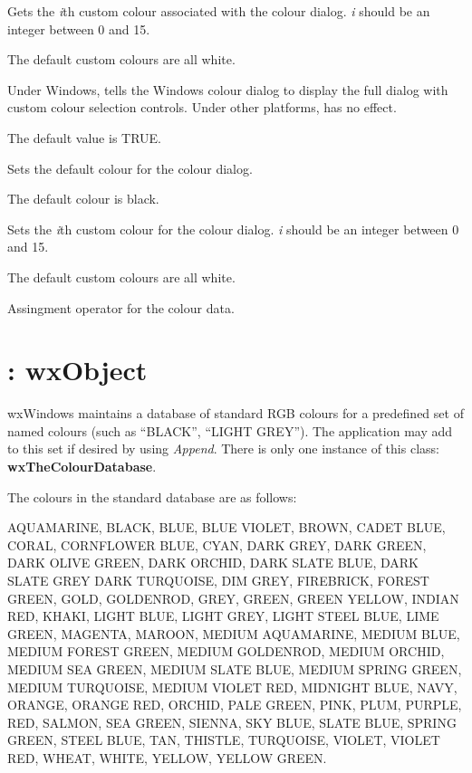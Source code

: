 
Gets the {\it i}th custom colour associated with the colour dialog. {\it i} should
be an integer between 0 and 15.

The default custom colours are all white.



Under Windows, tells the Windows colour dialog to display the full dialog
with custom colour selection controls. Under other platforms, has no effect.

The default value is TRUE.



Sets the default colour for the colour dialog.

The default colour is black.



Sets the {\it i}th custom colour for the colour dialog. {\it i} should
be an integer between 0 and 15.

The default custom colours are all white.



Assingment operator for the colour data.


\section{: wxObject}\label{wxcolourdatabase}

wxWindows maintains a database of standard RGB colours for a predefined
set of named colours (such as ``BLACK'', ``LIGHT GREY''). The
application may add to this set if desired by using {\it Append}.  There
is only one instance of this class: {\bf wxTheColourDatabase}.

The colours in the standard database are as follows:

AQUAMARINE, BLACK, BLUE, BLUE VIOLET, BROWN, CADET BLUE, CORAL,
CORNFLOWER BLUE, CYAN, DARK GREY, DARK GREEN, DARK OLIVE GREEN, DARK
ORCHID, DARK SLATE BLUE, DARK SLATE GREY DARK TURQUOISE, DIM GREY,
FIREBRICK, FOREST GREEN, GOLD, GOLDENROD, GREY, GREEN, GREEN YELLOW,
INDIAN RED, KHAKI, LIGHT BLUE, LIGHT GREY, LIGHT STEEL BLUE, LIME GREEN,
MAGENTA, MAROON, MEDIUM AQUAMARINE, MEDIUM BLUE, MEDIUM FOREST GREEN,
MEDIUM GOLDENROD, MEDIUM ORCHID, MEDIUM SEA GREEN, MEDIUM SLATE BLUE,
MEDIUM SPRING GREEN, MEDIUM TURQUOISE, MEDIUM VIOLET RED, MIDNIGHT BLUE,
NAVY, ORANGE, ORANGE RED, ORCHID, PALE GREEN, PINK, PLUM, PURPLE, RED,
SALMON, SEA GREEN, SIENNA, SKY BLUE, SLATE BLUE, SPRING GREEN, STEEL
BLUE, TAN, THISTLE, TURQUOISE, VIOLET, VIOLET RED, WHEAT, WHITE, YELLOW,
YELLOW GREEN.

